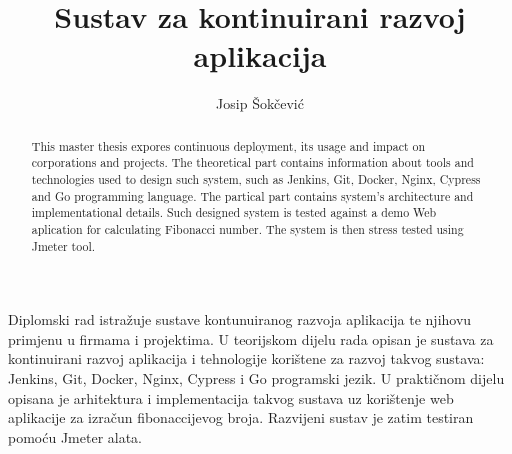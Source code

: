 \documentclass[times, utf8, numeric, diplomski]{ferit}
\begin{document}
\sloppy
{} %
\title{Sustav za kontinuirani razvoj aplikacija}

\author{Josip Šokčević}
\maketitle



\tableofcontents














\begin{sazetak}
Diplomski rad istražuje sustave kontunuiranog razvoja aplikacija te njihovu primjenu u firmama i
projektima. U teorijskom dijelu rada opisan je sustava za kontinuirani razvoj aplikacija i
tehnologije korištene za razvoj takvog sustava: Jenkins, Git, Docker, Nginx, Cypress i Go
programski jezik. U praktičnom dijelu opisana je arhitektura i implementacija takvog sustava uz
korištenje web aplikacije za izračun fibonaccijevog broja. Razvijeni sustav je zatim testiran
pomoću Jmeter alata.

\end{sazetak}

\begin{abstract}
This master thesis expores continuous deployment, its usage and impact on corporations and projects.
The theoretical part contains information about tools and technologies used to design such system,
such as Jenkins, Git, Docker, Nginx, Cypress and Go programming language. The partical part contains
system's architecture and implementational details. Such designed system is tested against a demo
Web aplication for calculating Fibonacci number. The system is then stress tested using Jmeter tool.

\end{abstract}
\end{document}
